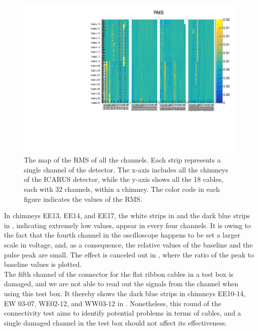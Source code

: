 \begin{figure}
\centering
\includegraphics[width=\textwidth]{fig/RMS.pdf}
\caption{The map of the RMS of all the channels.
Each strip represents a single channel of the detector.
The x-axis includes all the chimneys of the ICARUS detector, while
the y-axis shows all the 18 cables, each with 32 channels, within a chimney.
The color code in each figure indicates the values of the RMS.}
\label{fig:rms}
\end{figure}

In chimneys EE13, EE14, and EE17, the white strips in  
and the dark blue strips in ,
indicating extremely low values,
appear in every four channels.
It is owing to the fact that the fourth channel in the oscilloscope
happens to be set a larger scale in voltage, and, as a consequence, 
the relative values of the baseline and the pulse peak are small.
The effect is canceled out in , where the
ratio of the peak to baseline values is plotted.\\

The fifth channel of the connector for the flat ribbon cables in a test
box is damaged, and we are not able to read out the signals from the
channel when using this test box.
It thereby shows the dark blue strips in chimneys EE10-14, EW 03-07,
WE02-12, and WW03-12 in .
Nonetheless, this round of the connectivity test aims to identify
potential problems in terms of cables, and a single damaged channel
in the test box should not affect its effectiveness.\\

